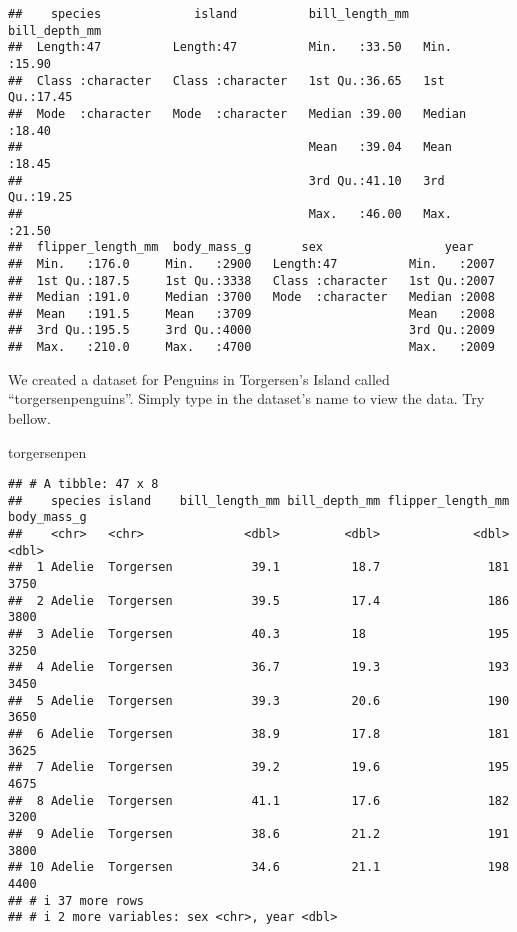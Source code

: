 \documentclass[
]{article}
\newenvironment{Shaded}{\begin{snugshade}}{\end{snugshade}}
\newcommand{\NormalTok}[1]{#1}
\begin{document}
\begin{verbatim}
##    species             island          bill_length_mm  bill_depth_mm  
##  Length:47          Length:47          Min.   :33.50   Min.   :15.90  
##  Class :character   Class :character   1st Qu.:36.65   1st Qu.:17.45  
##  Mode  :character   Mode  :character   Median :39.00   Median :18.40  
##                                        Mean   :39.04   Mean   :18.45  
##                                        3rd Qu.:41.10   3rd Qu.:19.25  
##                                        Max.   :46.00   Max.   :21.50  
##  flipper_length_mm  body_mass_g       sex                 year     
##  Min.   :176.0     Min.   :2900   Length:47          Min.   :2007  
##  1st Qu.:187.5     1st Qu.:3338   Class :character   1st Qu.:2007  
##  Median :191.0     Median :3700   Mode  :character   Median :2008  
##  Mean   :191.5     Mean   :3709                      Mean   :2008  
##  3rd Qu.:195.5     3rd Qu.:4000                      3rd Qu.:2009  
##  Max.   :210.0     Max.   :4700                      Max.   :2009
\end{verbatim}

We created a dataset for Penguins in Torgersen's Island called
``torgersenpenguins''. Simply type in the dataset's name to view the
data. Try bellow.

\begin{Shaded}
\begin{Highlighting}[]
\NormalTok{torgersenpen}
\end{Highlighting}
\end{Shaded}

\begin{verbatim}
## # A tibble: 47 x 8
##    species island    bill_length_mm bill_depth_mm flipper_length_mm body_mass_g
##    <chr>   <chr>              <dbl>         <dbl>             <dbl>       <dbl>
##  1 Adelie  Torgersen           39.1          18.7               181        3750
##  2 Adelie  Torgersen           39.5          17.4               186        3800
##  3 Adelie  Torgersen           40.3          18                 195        3250
##  4 Adelie  Torgersen           36.7          19.3               193        3450
##  5 Adelie  Torgersen           39.3          20.6               190        3650
##  6 Adelie  Torgersen           38.9          17.8               181        3625
##  7 Adelie  Torgersen           39.2          19.6               195        4675
##  8 Adelie  Torgersen           41.1          17.6               182        3200
##  9 Adelie  Torgersen           38.6          21.2               191        3800
## 10 Adelie  Torgersen           34.6          21.1               198        4400
## # i 37 more rows
## # i 2 more variables: sex <chr>, year <dbl>
\end{verbatim}
\end{document}
